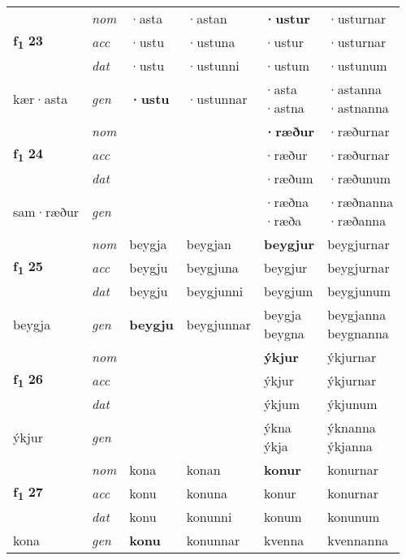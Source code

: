 \begin{longtable}[l]{X>{\footnotesize\itshape}XXXXX}
\multirow{3}{*}{{{\textbf{f{\textsubscript{1}}} \Large{\textbf{23}}}}} & nom & ·asta & ·astan & \textbf{·ustur} & ·usturnar \\*
 & acc & ·ustu & ·ustuna & ·ustur & ·usturnar \\*
 & dat & ·ustu & ·ustunni & ·ustum & ·ustunum \\*
 {\footnotesize{kær\allowbreak ·asta}} & gen & \textbf{·ustu} & ·ustunnar & \specialcell{·asta\\  ·astna} & \specialcell{·astanna\\  ·astnanna} \\
\midrule

\multirow{3}{*}{{{\textbf{f{\textsubscript{1}}} \Large{\textbf{24}}}}} & nom &  &  & \textbf{·ræður} & ·ræðurnar \\*
 & acc &  &  & ·ræður & ·ræðurnar \\*
 & dat &  &  & ·ræðum & ·ræðunum \\*
 {\footnotesize{sam\allowbreak ·ræður}} & gen & \textbf{} &  & \specialcell{·ræðna\\  ·ræða} & \specialcell{·ræðnanna\\  ·ræðanna} \\
\midrule

\multirow{3}{*}{{{\textbf{f{\textsubscript{1}}} \Large{\textbf{25}}}}} & nom & beygja & beygjan & \textbf{beygjur} & beygjurnar \\*
 & acc & beygju & beygjuna & beygjur & beygjurnar \\*
 & dat & beygju & beygjunni & beygjum & beygjunum \\*
 {\footnotesize{beygja}} & gen & \textbf{beygju} & beygjunnar & \specialcell{beygja\\ beygna} & \specialcell{beygjanna\\ beygnanna} \\
\midrule

\multirow{3}{*}{{{\textbf{f{\textsubscript{1}}} \Large{\textbf{26}}}}} & nom &  &  & \textbf{ýkjur} & ýkjurnar \\*
 & acc &  &  & ýkjur & ýkjurnar \\*
 & dat &  &  & ýkjum & ýkjunum \\*
 {\footnotesize{ýkjur}} & gen & \textbf{} &  & \specialcell{ýkna\\ ýkja} & \specialcell{ýknanna\\ ýkjanna} \\
\midrule

\multirow{3}{*}{{{\textbf{f{\textsubscript{1}}} \Large{\textbf{27}}}}} & nom & kona & konan & \textbf{konur} & konurnar \\*
 & acc & konu & konuna & konur & konurnar \\*
 & dat & konu & konunni & konum & konunum \\*
 {\footnotesize{kona}} & gen & \textbf{konu} & konunnar & kvenna & kvennanna \\
\midrule


\end{longtable}
